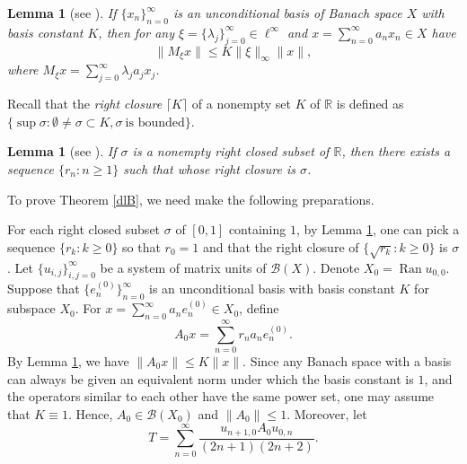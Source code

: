 \documentclass[12pt]{amsart}
\numberwithin{equation}{section}
\theoremstyle{plain}
\newtheorem{lem}[thm]{Lemma}
\theoremstyle{definition}
\newcommand{\B}{{\mathcal{B}}}
\newcommand{\ran}{\operatorname{Ran}}
\begin{document}
\begin{lem}[see \cite{CNL2005}]\label{unc}
If $\{x_n\}_{n=0}^{\infty}$ is an unconditional basis of Banach space $X$ with basis constant $K$, then
for any $\xi=\{\lambda_j\}_{j=0}^{\infty}\in \ell^{\infty}$ and $x=\sum_{n=0}^{\infty}a_nx_n\in X$ have
$$\|M_{\xi}x\|\leq K\|\xi\|_{\infty}\|x\|,$$
where $M_{\xi}x=\sum_{j=0}^{\infty}\lambda_j a_jx_j$.
\end{lem}
Recall that the {\em right closure} $\lceil K\rceil$ of a nonempty set $K$ of $\mathbb{R}$ is defined as $\{\sup\sigma:\emptyset\neq\sigma\subset K, \sigma \ \text{is bounded} \}$.
\begin{lem}[see {\cite[Lemma 3.7]{JiZhang}}]\label{rcl}
If $\sigma$ is a nonempty right closed subset of $\mathbb{R}$, then there exists a sequence $\{r_n:n\geq1\}$ such that whose right closure is $\sigma$.
\end{lem}

To prove Theorem \ref{dlB}, we need make the following preparations.

For each right closed subset $\sigma$ of $[0,1]$ containing $1$,
by Lemma \ref{rcl}, one can pick a sequence $\{r_k:k\geq0\}$ so that $r_0=1$ and that the right closure of $\{\sqrt{r_k}: k\geq 0\}$ is $\sigma$.
Let $\{u_{i,j}\}_{i,j=0}^{\infty}$ be a system of matrix units of $\B(X)$.
Denote $X_0=\ran u_{0,0}$.
Suppose that $\{e_n^{(0)}\}_{n=0}^{\infty}$ is an unconditional basis with basis constant $K$ for subspace $X_0$.
For $x=\sum_{n=0}^{\infty}a_ne_n^{(0)}\in X_0$, define
$$A_0x=\sum_{n=0}^{\infty}r_n a_ne_n^{(0)}.$$
By Lemma \ref{unc}, we have $\|A_0x\|\leq K\|x\|$.
Since any Banach space with a basis can always be given an equivalent norm under which the basis constant is $1$, and the operators similar to each other have the same power set, one may assume that $K\equiv 1$.
Hence, $A_0\in \B(X_0)$ and $\|A_0\|\leq 1$.
Moreover, let
\begin{equation}\label{T:Reality}
T=\sum\limits_{n=0}^{\infty}\frac{u_{n+1,0}  A_0 u_{0,n}}{(2n+1)(2n+2)}.
\end{equation}
\end{document}

